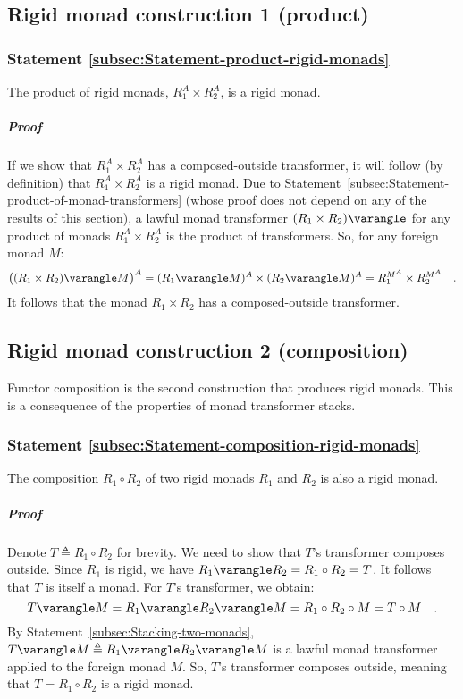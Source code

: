 \subsection{Rigid monad construction 1 (product)}

\subsubsection{Statement \label{subsec:Statement-product-rigid-monads}\ref{subsec:Statement-product-rigid-monads}}

The product of rigid monads, $R_{1}^{A}\times R_{2}^{A}$, is a rigid
monad.

\subparagraph{Proof}

If we show that $R_{1}^{A}\times R_{2}^{A}$ has a composed-outside
transformer, it will follow (by definition) that $R_{1}^{A}\times R_{2}^{A}$
is a rigid monad. Due to Statement~\ref{subsec:Statement-product-of-monad-transformers}
(whose proof does not depend on any of the results of this section),
a lawful monad transformer $(R_{1}\times R_{2})\varangle$ for any
product of monads $R_{1}^{A}\times R_{2}^{A}$ is the product of transformers.
So, for any foreign monad $M$:
\[
\big((R_{1}\times R_{2})\varangle M\big)^{A}=(R_{1}\varangle M)^{A}\times(R_{2}\varangle M)^{A}=R_{1}^{M^{A}}\times R_{2}^{M^{A}}\quad.
\]
It follows that the monad $R_{1}\times R_{2}$ has a composed-outside
transformer.

\subsection{Rigid monad construction 2 (composition)}

Functor composition is the second construction that produces rigid
monads. This is a consequence of the properties of monad transformer
stacks.

\subsubsection{Statement \label{subsec:Statement-composition-rigid-monads}\ref{subsec:Statement-composition-rigid-monads}}

The composition $R_{1}\circ R_{2}$ of two rigid monads $R_{1}$ and
$R_{2}$ is also a rigid monad.

\subparagraph{Proof}

Denote $T\triangleq R_{1}\circ R_{2}$ for brevity. We need to show
that $T$\textsf{'}s transformer composes outside. Since $R_{1}$ is rigid,
we have $R_{1}\varangle R_{2}=R_{1}\circ R_{2}=T$. It follows that
$T$ is itself a monad. For $T$\textsf{'}s transformer, we obtain:
\[
T\varangle M=R_{1}\varangle R_{2}\varangle M=R_{1}\circ R_{2}\circ M=T\circ M\quad.
\]
By Statement~\ref{subsec:Stacking-two-monads}, $T\varangle M\triangleq R_{1}\varangle R_{2}\varangle M$
is a lawful monad transformer applied to the foreign monad $M$. So,
$T$\textsf{'}s transformer composes outside, meaning that $T=R_{1}\circ R_{2}$
is a rigid monad.

